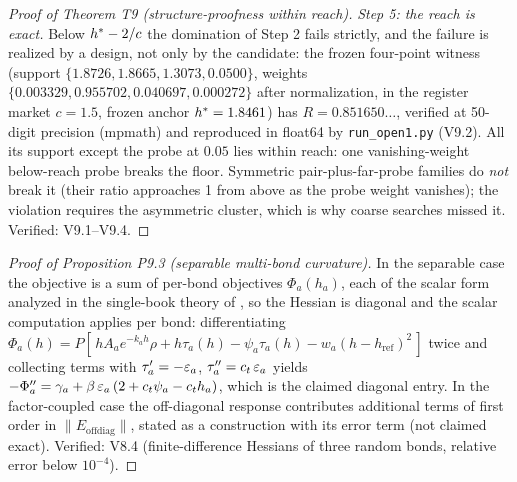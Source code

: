 \documentclass[11pt]{article}
\begin{document}
\begin{proof}[Proof of Theorem T9 (structure-proofness within reach)]
\emph{Step 5: the reach is exact.} Below $h^{*} - 2/c$ the
domination of Step 2 fails strictly, and the failure is realized by a
design, not only by the candidate: the frozen four-point witness
(support $\{1.8726, 1.8665, 1.3073, 0.0500\}$, weights
$\{0.003329, 0.955702, 0.040697, 0.000272\}$ after normalization, in
the register market $c = 1.5$, frozen anchor $h^{*} = 1.8461$) has
$R = 0.851650\ldots$, verified at 50-digit precision (mpmath) and
reproduced in float64 by \texttt{run\_open1.py} (V9.2). All its
support except the probe at $0.05$ lies within reach: one
vanishing-weight below-reach probe breaks the floor. Symmetric
pair-plus-far-probe families do \emph{not} break it (their ratio
approaches 1 from above as the probe weight vanishes); the violation
requires the asymmetric cluster, which is why coarse searches missed
it. Verified: V9.1--V9.4.
\end{proof}

\begin{proof}[Proof of Proposition P9.3 (separable multi-bond curvature)]
In the separable case the objective is a sum of per-bond objectives
$\Phi_a(h_a)$, each of the scalar form analyzed in the single-book
theory of \citet{reflex2026}, so the Hessian is diagonal and the scalar computation applies
per bond: differentiating $\Phi_a(h) = P[\,h A_a e^{-k_a h}\rho + h
\tau_a(h) - \psi_a \tau_a(h) - w_a (h - h_{\mathrm{ref}})^2\,]$ twice and
collecting terms with $\tau_a' = -\varepsilon_a$, $\tau_a'' = c_t\,\varepsilon_a$ yields
$-\Phi_a'' = \gamma_a + \beta\,\varepsilon_a\,(2 + c_t\psi_a - c_t h_a)$, which is
the claimed diagonal entry. In the factor-coupled case the off-diagonal
response contributes additional terms of first order in
$\|E_{\mathrm{offdiag}}\|$, stated as a construction with its error term
(not claimed exact). Verified: V8.4 (finite-difference Hessians of three
random bonds, relative error below $10^{-4}$).
\end{proof}

\end{document}
